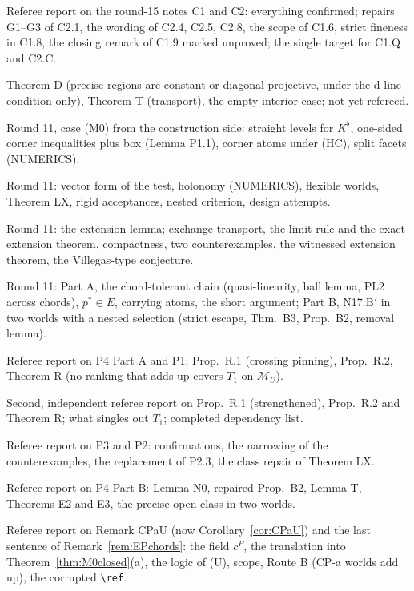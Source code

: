 \documentclass[11pt]{article}
\theoremstyle{definition}
\theoremstyle{remark}
\newcommand{\M}{\mathcal M}
\begin{document}
\begin{description}[leftmargin=*,font=\normalfont\ttfamily,style=nextline]
\item[C12\_referee.md] Referee report on the round-15 notes C1 and C2: everything confirmed; repairs G1--G3 of C2.1, the wording of C2.4, C2.5, C2.8, the scope of C1.6, strict fineness in C1.8, the closing remark of C1.9 marked unproved; the single target for C1.Q and C2.C.
\item[PropD\_notes.md] Theorem D (precise regions are constant or diagonal-projective, under the d-line condition only), Theorem T (transport), the empty-interior case; not yet refereed.
\item[P1\_notes.md] Round 11, case (M0) from the construction side: straight levels for $K^\flat$, one-sided corner inequalities plus box (Lemma P1.1), corner atoms under (HC), split facets (NUMERICS).
\item[P2\_notes.md] Round 11: vector form of the test, holonomy (NUMERICS), flexible worlds, Theorem LX, rigid acceptances, nested criterion, design attempts.
\item[P3\_notes.md] Round 11: the extension lemma; exchange transport, the limit rule and the exact extension theorem, compactness, two counterexamples, the witnessed extension theorem, the Villegas-type conjecture.
\item[P4\_notes.md] Round 11: Part A, the chord-tolerant chain (quasi-linearity, ball lemma, PL2 across chords), $p^*\in E$, carrying atoms, the short argument; Part B, N17.B$'$ in two worlds with a nested selection (strict escape, Thm.~B3, Prop.~B2, removal lemma).
\item[M0\_referee.md] Referee report on P4 Part A and P1; Prop.~R.1 (crossing pinning), Prop.~R.2, Theorem R (no ranking that adds up covers $T_1$ on $\M_U$).
\item[M0\_second\_referee.md] Second, independent referee report on Prop.~R.1 (strengthened), Prop.~R.2 and Theorem R; what singles out $T_1$; completed dependency list.
\item[P2P3\_referee.md] Referee report on P3 and P2: confirmations, the narrowing of the counterexamples, the replacement of P2.3, the class repair of Theorem LX.
\item[P4B\_referee.md] Referee report on P4 Part B: Lemma N0, repaired Prop.~B2, Lemma T, Theorems E2 and E3, the precise open class in two worlds.
\item[CPaU\_referee.md] Referee report on Remark CPaU (now Corollary~\ref{cor:CPaU}) and the last sentence of Remark~\ref{rem:EPchords}: the field $c^P$, the translation into Theorem~\ref{thm:M0closed}(a), the logic of (U), scope, Route B (CP-a worlds add up), the corrupted \texttt{\textbackslash ref}.

\end{description}
\end{document}
